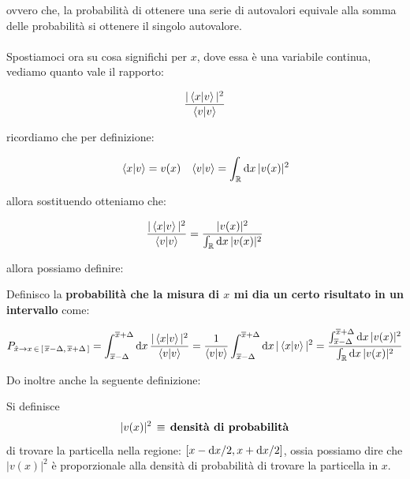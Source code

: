 	ovvero che, la probabilità di ottenere una serie di autovalori equivale alla somma delle probabilità si ottenere il singolo autovalore.
	\\
	\\
	Spostiamoci ora su cosa significhi per $x$, dove essa è una variabile continua, vediamo quanto vale il rapporto:

\begin{align*}
	 \frac{|\braket{x}{v}|^2}{\braket{v}}
\end{align*}
	
	ricordiamo che per definizione:
	
\begin{align*}
	&\braket{x}{v} = v(x)
	&\braket{v} = \int_{\mathbb{R}} \dd x \, |v(x)|^2
\end{align*}
	
	allora sostituendo otteniamo che:
	
\begin{align*}
	 \frac{|\braket{x}{v}|^2}{\braket{v}} = \frac{|v(x)|^2}{\int_{\mathbb{R}} \dd x \, |v(x)|^2}
\end{align*}

	allora possiamo definire:
	
\begin{mydef}
	Definisco la \textbf{probabilità che la misura di $x$ mi dia un certo risultato in un intervallo} come:
	
\begin{align*}
	P_{\hat{x} \to x \, \in \, \qty[\, \overline{x} - \Delta, \, \overline{x} + \Delta \, ]} = \int_{\overline{x} - \Delta}^{\overline{x} + \Delta } \dd x \,\frac{|\braket{x}{v}|^2}{\braket{v}} = \frac{1}{\braket{v}}\int_{\overline{x} - \Delta}^{\overline{x} + \Delta } \dd x \, |\braket{x}{v}|^2 = \frac{  \int_{\overline{x} - \Delta}^{\overline{x} + \Delta } \dd x \, |v(x)|^2  }{  \int_{\mathbb{R}} \dd x \, |v(x)|^2    }
\end{align*}
\end{mydef}
	
	Do inoltre anche la seguente definizione:
	
\begin{mydef}
	Si definisce
\begin{align*}
	|v(x)|^2 \, \equiv \, \text{\textbf{densità di probabilità}}
\end{align*}
	di trovare la particella nella regione: $\qty[x-\dd x/2, x + \dd x/2]$, ossia possiamo dire che $|v(x)|^2$ è proporzionale alla densità di probabilità di trovare la particella in $x$.
\end{mydef}	

